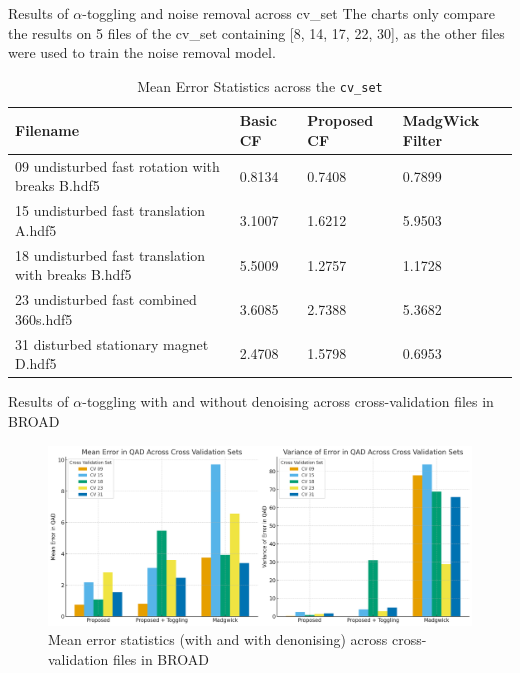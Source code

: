 \documentclass[aspectratio=169,xcolor=dvipsnames]{beamer}
\begin{document}
\begin{frame}{Results of $\alpha$-toggling and noise removal across cv_set}
\small
The charts only compare the results on 5 files of the cv\_set containing [8, 14, 17, 22, 30], as the other files were used to train the noise removal model.
\begin{table}[H]
\centering
\caption{Mean Error Statistics across the \texttt{cv\_set}}
\label{tab:error_statistics_cvset_mean}
    \begin{tabular}{|p{}|p{}|p{}|p{}|}
    \hline
    \textbf{Filename} & \textbf{Basic CF} & \textbf{Proposed CF} & \textbf{ MadgWick Filter} \\
    \hline
    09 undisturbed fast rotation with breaks B.hdf5 & 0.8134 & 0.7408 & 0.7899 \\
    \hline
    15 undisturbed fast translation A.hdf5 & 3.1007 & 1.6212 & 5.9503 \\
    \hline
    18 undisturbed fast translation with breaks B.hdf5 & 5.5009 & 1.2757 & 1.1728 \\
    \hline
    23 undisturbed fast combined 360s.hdf5 & 3.6085 & 2.7388 & 5.3682 \\
    \hline
    31 disturbed stationary magnet D.hdf5 & 2.4708 & 1.5798 & 0.6953 \\
    \hline
    \end{tabular}
\end{table}
    
\end{frame}

\begin{frame}{Results of $\alpha$-toggling with and without denoising across cross-validation files in BROAD}
\small

\begin{figure}
    \centering
    \includegraphics[width=\linewidth,height=0.65\textheight,keepaspectratio]{logos/barchart_correct_slide.png}
    \caption{Mean error statistics (with and with denonising) across cross-validation files in BROAD}
    \label{fig:rmnoise_chart}
\end{figure}
\hfill
\end{frame}
\end{document}
